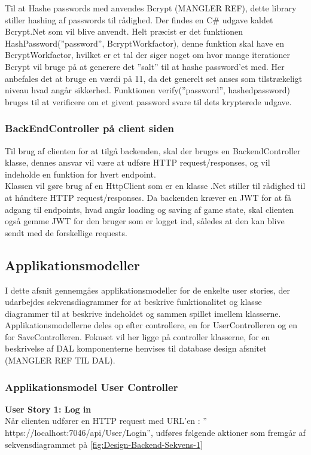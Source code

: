Til at Hashe passwords med anvendes Bcrypt (MANGLER REF), dette library stiller hashing af passwords til rådighed. Der findes en C\# udgave kaldet Bcrypt.Net  som vil blive anvendt. Helt præcist er det funktionen HashPassword(”password”, BcryptWorkfactor), denne funktion skal have en BcryptWorkfactor, hvilket er et tal der siger noget om hvor mange iterationer Bcrypt vil bruge på at generere det ”salt” til at hashe password’et med. Her anbefales det at bruge en værdi på 11, da det generelt set anses som tilstrækeligt niveau hvad angår sikkerhed.
Funktionen verify(”password”, hashedpassword) bruges til at verificere om et givent password svare til dets krypterede udgave.\\

\subsubsection{BackEndController på client siden}
Til brug af clienten for at tilgå backenden, skal der bruges en BackendController klasse, dennes ansvar vil være at udføre HTTP request/responses, og vil indeholde en funktion for hvert endpoint.\\
 
Klassen vil gøre brug af en HttpClient som er en klasse .Net stiller til rådighed til at håndtere HTTP request/responses. Da backenden kræver en JWT for at få adgang til endpoints, hvad angår loading og saving af game state, skal clienten også gemme JWT for den bruger som er logget ind, således at den kan blive sendt med de forskellige requests.


\subsection{Applikationsmodeller}
I dette afsnit gennemgåes applikationsmodeller for de enkelte user stories, der udarbejdes sekvensdiagrammer for at beskrive funktionalitet og klasse diagrammer til at beskrive indeholdet og sammen spillet imellem klasserne. Applikationsmodellerne deles op efter controllere, en for UserControlleren og en for SaveControlleren. Fokuset vil her ligge på controller klasserne, for en beskrivelse af DAL komponenterne henvises til database design afsnitet (MANGLER REF TIL DAL).\\

\subsubsection{Applikationsmodel User Controller}
\textbf{User Story 1: Log in}\\
Når clienten udfører en HTTP request med URL’en : ” https://localhost:7046/api/User/Login”, udføres følgende aktioner som fremgår af sekvensdiagrammet på \autoref{fig:Design-Backend-Sekvens-1}\\ 

